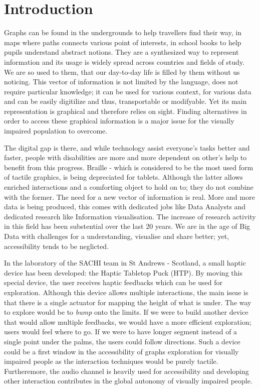 \chapter{Introduction}

Graphs can be found in the undergrounds to help travellers find their
way, in maps where paths connects various point of interests, in school
books to help pupils understand abstract notions. They are a synthesized
way to represent information and its usage is widely spread across
countries and fields of study. We are so used to them, that our
day-to-day life is filled by them without us noticing. This vector of
information is not limited by the language, does not require particular
knowledge; it can be used for various context, for various data and can
be easily digitilize and thus, transportable or modifyable. Yet its main
representation is graphical and therefore relies on sight. Finding
alternatives in order to access these graphical information is a major
issue for the visually impaired population to overcome. 

The digital gap is there, and while technology assist everyone's tasks
better and faster, people with disabilities are more and more dependent
on other's help to benefit from this progress. Braille - which is
considered to be the most used form of tactile graphics, is being
depreciated for tablets. Although the latter allows enriched
interactions and a comforting object to hold on to; they do not combine
with the former. The need for a new vector of information is real. More
and more data is being produced, this comes with dedicated jobs like
Data Analysts and dedicated research like Information visualisation. The
increase of research activity in this field has been substential over
the last 20 years. We are in the age of Big Data with challenges for a
understanding, visualise and share better; yet, accessibility tends
to be neglicted.

In the laboratory of the SACHI team in St Andrews - Scotland, a small
haptic device has been developed: the Haptic Tabletop Puck (HTP). By
moving this special device, the user receives haptic feedbacks which can
be used for exploration. Although this device allows multiple
interactions, the main issue is that there is a single actuator for
mapping the height of what is under. The way to explore would be to
\emph{bump} onto the limits. If we were to build another device that
would allow multiple feedbacks, we would have a more efficient
exploration; users would feel where to go. If we were to have longer
segment instead of a single point under the palms, the users could follow
directions. Such a device could be a first window in the accessibility
of graphs exploration for visually impaired people as the interaction
techniques would be purely tactile. Furtheremore, the audio channel is
heavily used for accessibility and developing other interaction
contributes in the global autonomy of visually impaired people.

